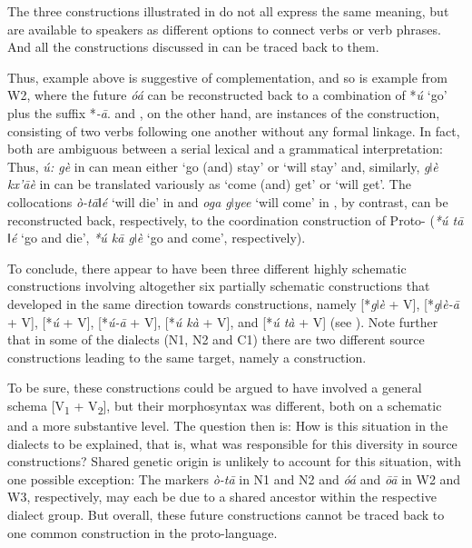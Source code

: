 \documentclass[output=paper]{langsci/langscibook}
\begin{document}


The three constructions illustrated in  do not all express the same meaning, but are available to speakers as different options to connect verbs or verb phrases. And all the  constructions discussed in  can be traced back to them. 


Thus, example  above is suggestive of complementation, and so is example  from W2, where the future  \textit{óá} can be reconstructed back to a combination of *\textit{ú} `go' plus the  suffix *\textit{-ā}.  and , on the other hand, are instances of the  construction, consisting of two verbs following one another without any formal linkage. In fact, both are ambiguous between a serial lexical and a grammatical interpretation: Thus, \textit{ú: gè} in  can mean either `go (and) stay' or `will stay' and, similarly, \textit{gǀè   kx'āè} in  can be translated variously as `come (and) get' or `will get'. The collocations \textit{ò-tāǁé} `will die' in  and \textit{oga gǀyee} `will come' in , by contrast, can be reconstructed back, respectively, to the coordination construction of Proto- (\textit{*ú tā ǁé} `go and die', \textit{*ú kā gǀè} `go and come', respectively).



To conclude, there appear to have been three different highly schematic constructions involving altogether six partially schematic constructions that developed in the same direction towards  constructions, namely 
[*\textit{gǀè} + V], 
[*\textit{gǀè-ā} + V], 
[*\textit{ú} + V], 
[*\textit{ú-ā} + V],
[*\textit{ú kà} + V], and 
[*\textit{ú tà} + V] (see ). Note further that in some of the dialects (\textsc N1, N2 and C1) there are two different source constructions leading to the same target, namely a  construction.



To be sure, these constructions could be argued to have involved a general schema [V\textsubscript{1} + V\textsubscript{2}], but their morphosyntax was different, both on a schematic and a more substantive level. The question then is: How is this situation in the  dialects to be explained, that is, what was responsible for this diversity in source constructions? Shared genetic origin is unlikely to account for this situation, with one possible exception: The markers \textit{ò-tā} in \textsc N1 and N2 and \textit{óá} and \textit{ōā} in W2 and W3, respectively, may each be due to a shared ancestor within the respective dialect group. But overall, these future constructions cannot be traced back to one common construction in the proto-language.
\end{document}
